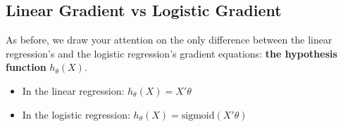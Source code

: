 \subsection*{Linear Gradient vs Logistic Gradient}
As before, we draw your attention on the only difference between the linear regression's 
and the logistic regression's gradient equations: \textbf{the hypothesis function} $h_\theta(X)$.
\begin{itemize}
    \item In the linear regression: $h_\theta(X) = X'\theta$
    \item In the logistic regression: $h_\theta(X) = \text{sigmoid}(X'\theta)$
\end{itemize}
